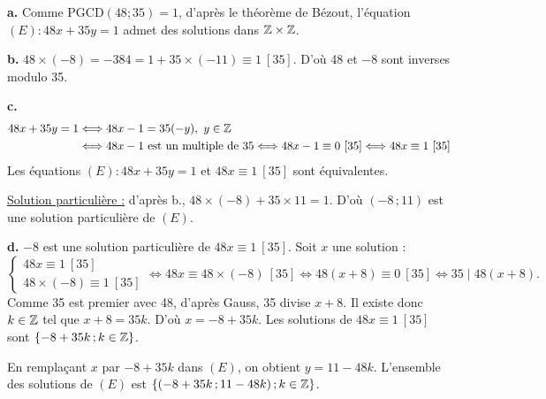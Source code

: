\documentclass[11pt]{article}
\begin{document}


\textbf{a.} Comme $\mathrm{PGCD}(48;35) = 1$, d'après le théorème de Bézout, l'équation $(E) : 48x + 35y = 1$ admet des solutions dans $\mathbb{Z} \times \mathbb{Z}$.

\textbf{b.} $48 \times (-8) = -384 = 1 + 35 \times (-11) \equiv 1\ [35]$. D'où 48 et $-8$ sont inverses modulo 35.

\textbf{c.}
\begin{align*}
48x + 35y = 1 &\Longleftrightarrow 48x - 1 = 35(-y),\ y \in \mathbb{Z} \\
&\Longleftrightarrow 48x - 1 \text{ est un multiple de } 35 \Longleftrightarrow 48x - 1 \equiv 0\ [35] \Longleftrightarrow 48x \equiv 1\ [35]
\end{align*}
Les équations $(E) : 48x + 35y = 1$ et $48x \equiv 1\ [35]$ sont équivalentes.

\underline{Solution particulière :} d'après b., $48 \times (-8) + 35 \times 11 = 1$. D'où $(-8\,;11)$ est une solution particulière de $(E)$.

\textbf{d.} $-8$ est une solution particulière de $48x \equiv 1\ [35]$. Soit $x$ une solution :
\[ \begin{cases} 48x \equiv 1\ [35] \\ 48 \times (-8) \equiv 1\ [35] \end{cases} \Longleftrightarrow 48x \equiv 48 \times (-8)\ [35] \Longleftrightarrow 48(x + 8) \equiv 0\ [35] \Longleftrightarrow 35 \mid 48(x + 8). \]
Comme 35 est premier avec 48, d'après Gauss, 35 divise $x + 8$. Il existe donc $k \in \mathbb{Z}$ tel que $x + 8 = 35k$. D'où $x = -8 + 35k$. Les solutions de $48x \equiv 1\ [35]$ sont $\{-8 + 35k\,;k \in \mathbb{Z}\}$.

En remplaçant $x$ par $-8 + 35k$ dans $(E)$, on obtient $y = 11 - 48k$. L'ensemble des solutions de $(E)$ est $\{(-8 + 35k\,;11 - 48k)\,;k \in \mathbb{Z}\}$.


\begin{center}
\end{center}
\end{document}

